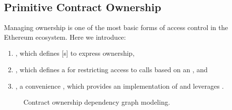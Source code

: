 \subsection{Primitive Contract Ownership}

Managing  ownership is one of the most basic forms of access
control in the Ethereum ecosystem. Here we introduce:

\begin{enumerate}
  \item {}, which defines [s] to
    express  ownership,
  \item {}, which defines a  for
    restricting access to  calls based on an , and
  \item {}, a convenience , which provides an
    implementation of  and leverages
    .
\end{enumerate}

\begin{figure}[H]
  \centering
  \caption{Contract ownership dependency graph modeling.}\label{fig:ownership}
\end{figure}






